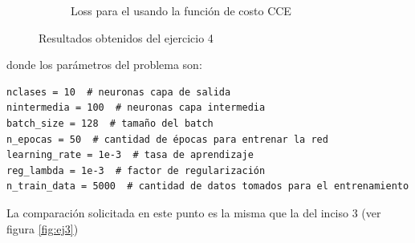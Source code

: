 \begin{figure}[H]
\begin{subfigure}[b]{0.45\textwidth}
         \caption{Loss para el usando la función de costo CCE}
         \label{fig:loss6a}
     \end{subfigure}
        \caption{Resultados obtenidos del ejercicio 4}
        \label{fig:ej5_TP1}
\end{figure}
donde los parámetros del problema son:
\begin{verbatim}
nclases = 10  # neuronas capa de salida
nintermedia = 100  # neuronas capa intermedia
batch_size = 128  # tamaño del batch
n_epocas = 50  # cantidad de épocas para entrenar la red
learning_rate = 1e-3  # tasa de aprendizaje
reg_lambda = 1e-3  # factor de regularización
n_train_data = 5000  # cantidad de datos tomados para el entrenamiento
\end{verbatim}

La comparación solicitada en este punto es la misma que la del inciso 3 (ver figura \ref{fig:ej3})